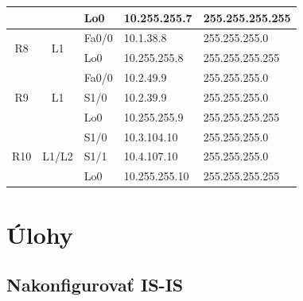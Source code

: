 \documentclass[12pt,twoside,a4paper]{report}
\begin{document}
\begin{table}[!htb]
\begin{tabular}{|c|c|l|l|l|}
                     &                                         & Lo0                                     & 10.255.255.7                            & 255.255.255.255                     \\ \hline
\multirow{2}{*}{R8}  & \multirow{2}{*}{L1}             & Fa0/0                                   & 10.1.38.8                               & 255.255.255.0                       \\ \cline{3-5} 
                     &                                         & Lo0                                     & 10.255.255.8                            & 255.255.255.255                     \\ \hline
\multirow{3}{*}{R9}  & \multirow{3}{*}{L1}             & Fa0/0                                   & 10.2.49.9                               & 255.255.255.0                       \\ \cline{3-5} 
                     &                                         & S1/0                                    & 10.2.39.9                               & 255.255.255.0                       \\ \cline{3-5} 
                     &                                         & Lo0                                     & 10.255.255.9                            & 255.255.255.255                     \\ \hline
\multirow{3}{*}{R10} & \multirow{3}{*}{L1/L2}                    & S1/0                                    & 10.3.104.10                              & 255.255.255.0                       \\ \cline{3-5} 
                     &                                         & S1/1                                    & 10.4.107.10                              & 255.255.255.0                       \\ \cline{3-5} 
                     &                                         & Lo0                                     & 10.255.255.10                           & 255.255.255.255                     \\ \hline
\end{tabular}
\end{table}


\newpage


\section{Úlohy}
\subsection{Nakonfigurovať IS-IS}
\end{document}
